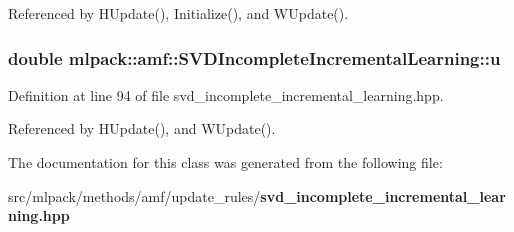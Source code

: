 Referenced by H\-Update(), Initialize(), and W\-Update().

\subsubsection[{u}]{\setlength{\rightskip}{0pt plus 5cm}double mlpack\-::amf\-::\-S\-V\-D\-Incomplete\-Incremental\-Learning\-::u\hspace{0.3cm}{\ttfamily [private]}}\label{classmlpack_1_1amf_1_1SVDIncompleteIncrementalLearning_ae86a953f3f95fc58ad25ef1618d53f58}


Definition at line 94 of file svd\-\_\-incomplete\-\_\-incremental\-\_\-learning.\-hpp.



Referenced by H\-Update(), and W\-Update().



The documentation for this class was generated from the following file\-:\begin{DoxyCompactItemize}
\item 
src/mlpack/methods/amf/update\-\_\-rules/{\bf svd\-\_\-incomplete\-\_\-incremental\-\_\-learning.\-hpp}\end{DoxyCompactItemize}

